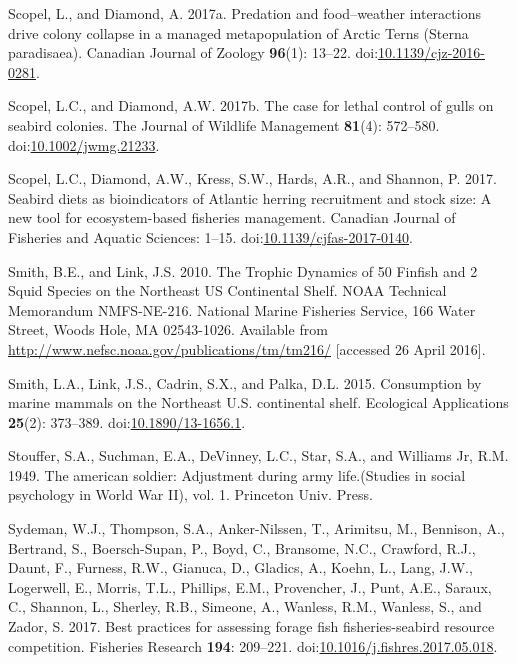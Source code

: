 \documentclass[]{article}
\begin{document}
\hypertarget{ref-scopel_predation_2017}{}
Scopel, L., and Diamond, A. 2017a. Predation and food--weather
interactions drive colony collapse in a managed metapopulation of Arctic
Terns (Sterna paradisaea). Canadian Journal of Zoology \textbf{96}(1):
13--22.
doi:\href{https://doi.org/10.1139/cjz-2016-0281}{10.1139/cjz-2016-0281}.

\hypertarget{ref-scopel_lauren_case_2017}{}
Scopel, L.C., and Diamond, A.W. 2017b. The case for lethal control of
gulls on seabird colonies. The Journal of Wildlife Management
\textbf{81}(4): 572--580.
doi:\href{https://doi.org/10.1002/jwmg.21233}{10.1002/jwmg.21233}.

\hypertarget{ref-scopel_seabird_2017}{}
Scopel, L.C., Diamond, A.W., Kress, S.W., Hards, A.R., and Shannon, P.
2017. Seabird diets as bioindicators of Atlantic herring recruitment and
stock size: A new tool for ecosystem-based fisheries management.
Canadian Journal of Fisheries and Aquatic Sciences: 1--15.
doi:\href{https://doi.org/10.1139/cjfas-2017-0140}{10.1139/cjfas-2017-0140}.

\hypertarget{ref-smith_trophic_2010}{}
Smith, B.E., and Link, J.S. 2010. The Trophic Dynamics of 50 Finfish and
2 Squid Species on the Northeast US Continental Shelf. NOAA Technical
Memorandum NMFS-NE-216. National Marine Fisheries Service, 166 Water
Street, Woods Hole, MA 02543-1026. Available from
\url{http://www.nefsc.noaa.gov/publications/tm/tm216/} {[}accessed 26
April 2016{]}.

\hypertarget{ref-smith_consumption_2015}{}
Smith, L.A., Link, J.S., Cadrin, S.X., and Palka, D.L. 2015. Consumption
by marine mammals on the Northeast U.S. continental shelf. Ecological
Applications \textbf{25}(2): 373--389.
doi:\href{https://doi.org/10.1890/13-1656.1}{10.1890/13-1656.1}.

\hypertarget{ref-stouffer1949american}{}
Stouffer, S.A., Suchman, E.A., DeVinney, L.C., Star, S.A., and Williams
Jr, R.M. 1949. The american soldier: Adjustment during army
life.(Studies in social psychology in World War II), vol. 1. Princeton
Univ. Press.

\hypertarget{ref-sydeman_best_2017}{}
Sydeman, W.J., Thompson, S.A., Anker-Nilssen, T., Arimitsu, M.,
Bennison, A., Bertrand, S., Boersch-Supan, P., Boyd, C., Bransome, N.C.,
Crawford, R.J., Daunt, F., Furness, R.W., Gianuca, D., Gladics, A.,
Koehn, L., Lang, J.W., Logerwell, E., Morris, T.L., Phillips, E.M.,
Provencher, J., Punt, A.E., Saraux, C., Shannon, L., Sherley, R.B.,
Simeone, A., Wanless, R.M., Wanless, S., and Zador, S. 2017. Best
practices for assessing forage fish fisheries-seabird resource
competition. Fisheries Research \textbf{194}: 209--221.
doi:\href{https://doi.org/10.1016/j.fishres.2017.05.018}{10.1016/j.fishres.2017.05.018}.
\end{document}
